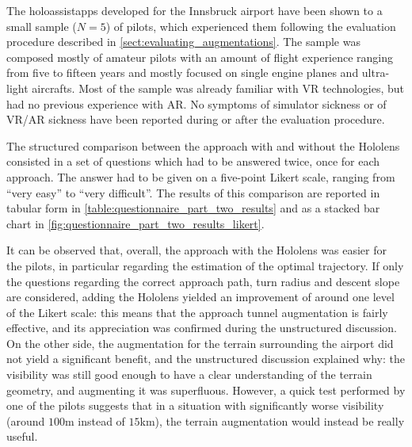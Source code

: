 The \glspl{holoassistapp} developed for the Innsbruck airport have been shown to a small sample ($N=5$) of pilots, which experienced them following the evaluation procedure described in \autoref{sect:evaluating_augmentations}. The sample was composed mostly of amateur pilots with an amount of flight experience ranging from five to fifteen years and mostly focused on single engine planes and ultra-light aircrafts. Most of the sample was already familiar with \gls{VR} technologies, but had no previous experience with \gls{AR}. No symptoms of simulator sickness or of \gls{VR}/\gls{AR} sickness have been reported during or after the evaluation procedure.

The structured comparison between the approach with and without the Hololens consisted in a set of questions which had to be answered twice, once for each approach. The answer had to be given on a five-point Likert scale, ranging from \enquote{very easy} to \enquote{very difficult}. The results of this comparison are reported in tabular form in \autoref{table:questionnaire_part_two_results} and as a stacked bar chart in \autoref{fig:questionnaire_part_two_results_likert}. 

It can be observed that, overall, the approach with the Hololens was easier for the pilots, in particular regarding the estimation of the optimal trajectory. If only the questions regarding the correct approach path, turn radius and descent slope are considered, adding the Hololens yielded an improvement of around one level of the Likert scale: this means that the approach tunnel augmentation is fairly effective, and its appreciation was confirmed during the unstructured discussion. On the other side, the augmentation for the terrain surrounding the airport did not yield a significant benefit, and the unstructured discussion explained why: the visibility was still good enough to have a clear understanding of the terrain geometry, and augmenting it was superfluous. However, a quick test performed by one of the pilots suggests that in a situation with significantly worse visibility (around $100$m instead of $15$km), the terrain augmentation would instead be really useful.

